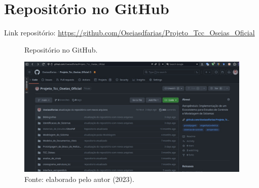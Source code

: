 \chapter{Repositório no GitHub}
\label{apendice_1}

Link repositório: \href{https://github.com/Oseiasdfarias/Projeto\_Tcc\_Oseias\_Oficial}{https://github.com/Oseiasdfarias/Projeto\_Tcc\_Oseias\_Oficial}

\begin{figure}[!h]
	\centering
	\caption{Repositório no GitHub.}
	\includegraphics[width=1.0\textwidth]{utils/repo_github.eps}
	\caption*{Fonte: elaborado pelo autor (2023).}
	\label{fig3:image_27}
\end{figure}


